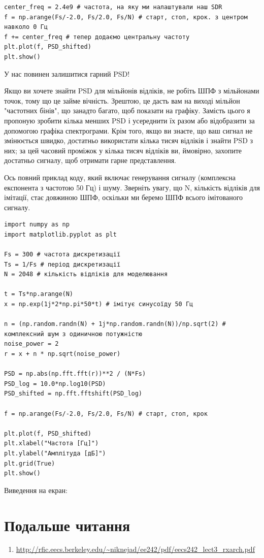 \begin{Verbatim}[breaklines=true,breakanywhere=true,fontsize=\small]
center_freq = 2.4e9 # частота, на яку ми налаштували наш SDR
f = np.arange(Fs/-2.0, Fs/2.0, Fs/N) # старт, стоп, крок. з центром навколо 0 Гц
f += center_freq # тепер додаємо центральну частоту
plt.plot(f, PSD_shifted)
plt.show()
\end{Verbatim}

У нас повинен залишитися гарний PSD!

Якщо ви хочете знайти PSD для мільйонів відліків, не робіть ШПФ з
мільйонами точок, тому що це займе вічність. Зрештою, це дасть вам на
виході мільйон "частотних бінів", що занадто багато, щоб показати на
графіку. Замість цього я пропоную зробити кілька менших PSD і усереднити
їх разом або відобразити за допомогою графіка спектрограми. Крім того,
якщо ви знаєте, що ваш сигнал не змінюється швидко, достатньо
використати кілька тисяч відліків і знайти PSD з них; за цей часовий
проміжок у кілька тисяч відліків ви, ймовірно, захопите достатньо
сигналу, щоб отримати гарне представлення.

Ось повний приклад коду, який включає генерування сигналу (комплексна
експонента з частотою 50 Гц) і шуму. Зверніть увагу, що N, кількість
відліків для імітації, стає довжиною ШПФ, оскільки ми беремо ШПФ всього
імітованого сигналу.

\begin{Verbatim}[breaklines=true,breakanywhere=true,fontsize=\small]
import numpy as np
import matplotlib.pyplot as plt

Fs = 300 # частота дискретизації
Ts = 1/Fs # період дискретизації
N = 2048 # кількість відліків для моделювання

t = Ts*np.arange(N)
x = np.exp(1j*2*np.pi*50*t) # імітує синусоїду 50 Гц

n = (np.random.randn(N) + 1j*np.random.randn(N))/np.sqrt(2) # комплексний шум з одиничною потужністю
noise_power = 2
r = x + n * np.sqrt(noise_power)

PSD = np.abs(np.fft.fft(r))**2 / (N*Fs)
PSD_log = 10.0*np.log10(PSD)
PSD_shifted = np.fft.fftshift(PSD_log)

f = np.arange(Fs/-2.0, Fs/2.0, Fs/N) # старт, стоп, крок

plt.plot(f, PSD_shifted)
plt.xlabel("Частота [Гц]")
plt.ylabel("Амплітуда [дБ]")
plt.grid(True)
plt.show()
\end{Verbatim}

Виведення на екран:



\section{Подальше
читання}\label{ux43fux43eux434ux430ux43bux44cux448ux435-ux447ux438ux442ux430ux43dux43dux44f}

\begin{enumerate}
\tightlist
\item
  \url{http://rfic.eecs.berkeley.edu/~niknejad/ee242/pdf/eecs242_lect3_rxarch.pdf}
\end{enumerate}
